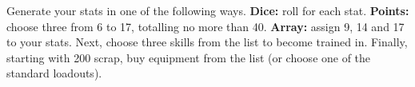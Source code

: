 
Generate your stats in one of the following ways. \textbf{Dice:} roll  for each stat. \textbf{Points:} choose three from 6 to 17, totalling no more than 40. \textbf{Array:} assign 9, 14 and 17 to your stats. Next, choose three skills from the list to become trained in. Finally, starting with 200 scrap, buy equipment from the list (or choose one of the standard loadouts).
